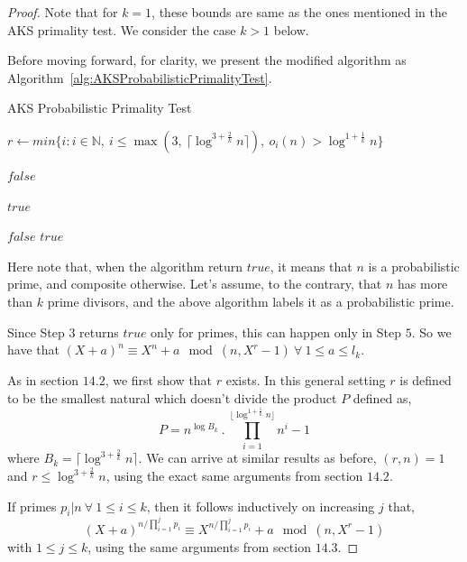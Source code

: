 \documentclass[11pt]{article}
\begin{document}
\begin{proof}
Note that for $k=1$, these bounds are same as the ones mentioned in the AKS primality test. We consider the case $k > 1$ below.

Before moving forward, for clarity, we present the modified algorithm as Algorithm~\ref{alg:AKSProbabilisticPrimalityTest}.

\begin{algorithm}
\caption{AKS Probabilistic Primality Test}
\label{alg:AKSProbabilisticPrimalityTest}
\begin{algorithmic}

\State $r \gets min \{i: i \in \mathbb{N},\ i \leq \max(3,\ \lceil \log^{3+\frac{2}{k}} n \rceil),\ o_i(n) > \log^{1+\frac{1}{k}} n \}$ 

		\State \Return $false$  
	\EndIf
\EndFor

	\Return $true$  
\EndIf

		\State \Return $false$  
	\EndIf
\EndFor
\State \Return $true$ 
\EndProcedure
\end{algorithmic}
\end{algorithm}

Here note that, when the algorithm return $true$, it means that $n$ is a probabilistic prime, and composite otherwise. Let's assume, to the contrary, that $n$ has more than $k$ prime divisors, and the above algorithm labels it as a probabilistic prime. 

Since Step $3$ returns $true$ only for primes, this can happen only in Step $5$. So we have that $(X+a)^n \equiv X^n + a \mod (n, X^r - 1)\ \forall\ 1 \leq a \leq l_k$.


As in section $14.2$, we first show that $r$ exists. In this general setting $r$ is defined to be the smallest natural which doesn't divide the product $P$ defined as,
\[P = n^{\log B_k}\ .\ \prod_{i=1}^{\lfloor \log^{1 + \frac{1}{k}} n \rfloor}{n^i-1} \]
where $B_k = \lceil \log^{3 + \frac{2}{k}} n \rceil$. We can arrive at similar results as before, $(r, n) = 1$ and $r \leq \log^{3 + \frac 2 {k}} n$, using the exact same arguments from section $14.2$.

If primes $p_i | n\ \forall \ 1 \leq i \leq k$, then it follows inductively on increasing $j$ that,
\[(X+a)^{n/\prod_{i=1}^{j} p_i} \equiv X^{n/\prod_{i=1}^{j} p_i} + a \mod (n, X^r - 1)\]
with $1 \leq j \leq k$, using the same arguments from section $14.3$.


\end{proof}
\end{document}
